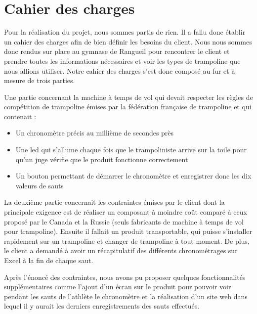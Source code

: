 \section{Cahier des charges}
Pour la réalisation du projet, nous sommes partis de rien. Il a fallu donc établir un cahier des charges afin de bien définir les besoins du client. Nous nous sommes donc rendus sur place au gymnase de Rangueil pour rencontrer le client et prendre toutes les informations nécessaires et voir les types de trampoline que nous allions utiliser. Notre cahier des charges s’est donc composé au fur et à mesure de trois parties. 

Une partie concernant la machine à temps de vol qui devait respecter les règles de compétition de trampoline émises par la fédération française de trampoline et qui contenait :
\begin{itemize}
    \item Un chronomètre précis au millième de secondes près
    \item Une led qui s’allume chaque fois que le trampoliniste arrive sur la toile pour qu’un juge vérifie que le produit fonctionne correctement
    \item Un bouton permettant de démarrer le chronomètre et enregistrer donc les dix valeurs de sauts
\end{itemize}

La deuxième partie concernait les contraintes émises par le client dont la principale exigence est de réaliser un composant à moindre coût comparé à ceux proposé par le Canada et la Russie (seuls fabricants de machine à temps de vol pour trampoline). Ensuite il fallait un produit transportable, qui puisse s’installer rapidement sur un trampoline et changer de trampoline à tout moment. De plus, le client a demandé à avoir un récapitulatif des différents chronométrages sur Excel à la fin de chaque saut. 

Après l’énoncé des contraintes, nous avons pu proposer quelques fonctionnalités supplémentaires comme l’ajout d’un écran sur le produit pour pouvoir voir pendant les sauts de l’athlète le chronomètre et la réalisation d’un site web dans lequel il y aurait les derniers enregistrements des sauts effectués.
